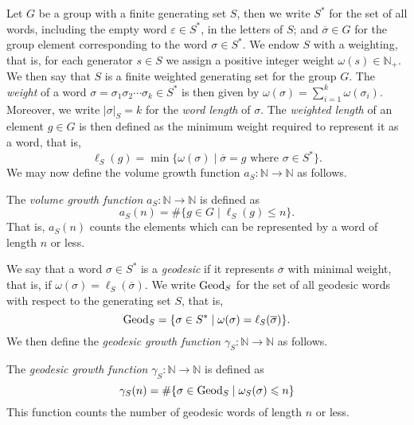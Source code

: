 Let $G$ be a group with a finite generating set $S$, then we write $S^*$ for the set of all words, including the empty word $\varepsilon \in S^*$, in the letters of $S$; and $\overline{\sigma} \in G$ for the group element corresponding to the word $\sigma \in S^*$.
We endow $S$ with a weighting, that is, for each generator $s \in S$ we assign a positive integer weight $\omega(s) \in \mathbb{N}_+$.
We then say that $S$ is a finite weighted generating set for the group $G$.
The \emph{weight} of a word $\sigma = \sigma_1 \sigma_2 \cdots \sigma_k \in S^*$ is then given by
$
	\omega(\sigma)
	=
	\sum_{i=1}^k
	\omega(\sigma_i)
$.
Moreover, we write $|\sigma|_S = k$ for the \emph{word length} of $\sigma$.
The \emph{weighted length} of an element $g \in G$ is then defined as the minimum weight required to represent it as a word, that is,
\[
	\ell_S(g)
	=
	\min\{
		\omega(\sigma)
	\mid
		\overline{\sigma} = g
		\text{ where }
		\sigma \in S^*
	\}.
\]
We may now define the volume growth function $a_S \colon \mathbb{N} \to \mathbb{N}$ as follows.

\begin{definition}\label{defn:volume-growth}
	The \emph{volume growth function} $a_S\colon \mathbb{N} \to \mathbb{N}$ is defined as
	\[
		a_S(n) = \#\{
			g \in G
		\mid
			\ell_S(g) \leq n
		\}.
	\]
	That is, $a_S(n)$ counts the elements which can be represented by a word of length $n$ or less.
\end{definition}

We say that a word $\sigma \in S^*$ is a \emph{geodesic} if it represents $\overline{\sigma}$ with minimal weight, that is, if $\omega(\sigma) = \ell_S(\overline{\sigma})$.
We write $\mathrm{Geod}_S$ for the set of all geodesic words with respect to the generating set $S$, that is,
\[
\mathrm{Geod}_S
=
\{
\sigma \in S^*
\mid
\omega(\sigma) = \ell_S(\overline{\sigma})
\}.
\]
We then define the \emph{geodesic growth function} $\gamma_S\colon \mathbb{N} \to \mathbb{N}$ as follows.

\begin{definition}\label{defn:geodesic-growth}
	The \emph{geodesic growth function} $\gamma_S \colon \mathbb{N} \to \mathbb{N}$ is defined as
	\[
	\gamma_{S}(n)
	=
	\#
	\{
	\sigma \in \mathrm{Geod}_S
	\mid
	\omega_S(\sigma) \leqslant n
	\}
	\]
	This function counts the number of geodesic words of length $n$ or less.
\end{definition}

